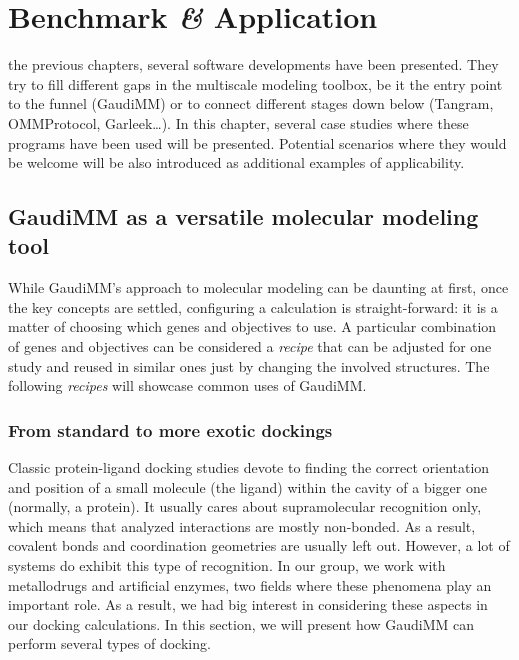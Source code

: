 

\chapter{Benchmark \textit{\&} Application}
\label{chap:06}

 the previous chapters, several software developments have been presented. They try to fill different gaps in the multiscale modeling toolbox, be it the entry point to the funnel (GaudiMM) or to connect different stages down below (Tangram, OMMProtocol, Garleek\ldots). In this chapter, several case studies where these programs have been used will be presented. Potential scenarios where they would be welcome will be also introduced as additional examples of applicability.

\section{GaudiMM as a versatile molecular modeling tool}

While GaudiMM's approach to molecular modeling can be daunting at first, once the key concepts are settled, configuring a calculation is straight-forward: it is a matter of choosing which genes and objectives to use. A particular combination of genes and objectives can be considered a \textit{recipe} that can be adjusted for one study and reused in similar ones just by changing the involved structures. The following \textit{recipes} will showcase common uses of GaudiMM.

\subsection{From standard to more exotic dockings}
\label{section:proteinliganddocking}
Classic protein-ligand docking studies devote to finding the correct orientation and position of a small molecule (the ligand) within the cavity of a bigger one (normally, a protein). It usually cares about supramolecular recognition only, which means that analyzed interactions are mostly non-bonded. As a result, covalent bonds and coordination geometries are usually left out. However, a lot of systems do exhibit this type of recognition. In our group, we work with metallodrugs and artificial enzymes, two fields where these phenomena play an important role. As a result, we had big interest in considering these aspects in our docking calculations. In this section, we will present how GaudiMM can perform several types of docking.


